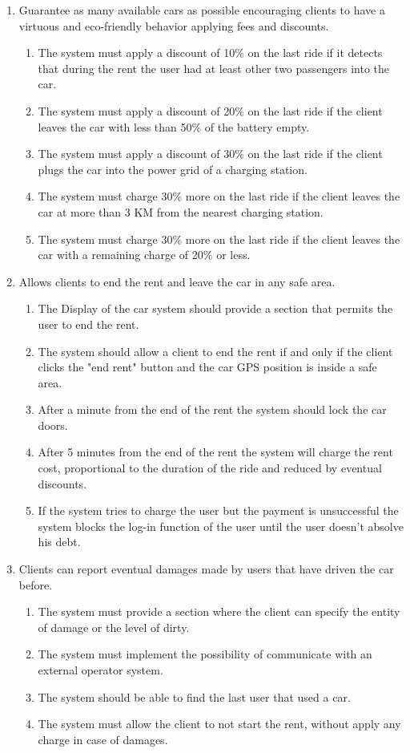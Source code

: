 \begin{enumerate}
\item Guarantee as many available cars as possible encouraging clients to have a virtuous and eco-friendly behavior applying fees and discounts.
\begin{enumerate}
\item The system must apply  a discount of 10\% on the last ride if it detects that during the rent the user had at least other two passengers into the car.
\item The system must apply a discount of 20\% on the last ride if the client leaves the car with less than 50\% of the battery empty.
\item The system must apply a discount of 30\% on the last ride if the client plugs the car into the power grid of a charging station.
\item The system must charge 30\% more on the last ride if the client leaves the car at more than 3 KM from the nearest charging station.
\item The system must charge 30\% more on the last ride if the client leaves the car with a remaining charge of 20\% or less.
\end{enumerate}
	

\item Allows clients to end the rent and leave the car in any safe area.
\begin{enumerate}
\item The Display of the car system should provide a section that permits the user to end the rent.
\item The system should allow a client to end the rent if and only if the client clicks the "end rent" button and the car GPS position is inside a safe area.
\item After a minute from the end of the rent the system should lock the car doors.
\item After 5 minutes from the end of the rent the system will charge the rent cost, proportional to the duration of the ride and reduced by eventual discounts.
\item If the system tries to charge the user but the payment is unsuccessful the system blocks the log-in function of the user until the user doesn't absolve his debt. 
\end{enumerate}

\item Clients can report eventual damages made by users that have driven the car before.
\begin{enumerate}
\item The system must provide a section where the client can specify the entity of damage or the level of dirty.
\item The system must implement the possibility of communicate with an external operator system.
\item The system should be able to find the last user that used a car.
\item The system must allow the client to not start the rent, without apply any charge in case of damages.
\end{enumerate}


\end{enumerate}
